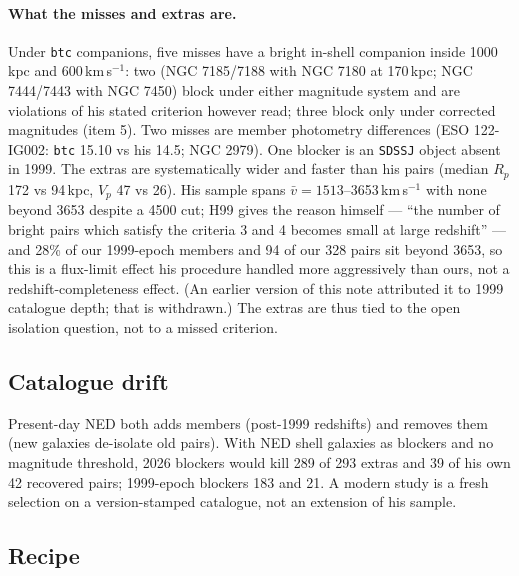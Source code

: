 \documentclass[11pt]{article}
\begin{document}
\paragraph{What the misses and extras are.} Under \texttt{btc} companions,
five misses have a bright in-shell companion inside 1000\,kpc and
600\,km\,s$^{-1}$: two (NGC 7185/7188 with NGC 7180 at 170\,kpc; NGC
7444/7443 with NGC 7450) block under either magnitude system and are
violations of his stated criterion however read; three block only under
corrected magnitudes (item 5). Two misses are member photometry differences
(ESO 122-IG002: \texttt{btc} 15.10 vs his 14.5; NGC 2979). One blocker is an
\texttt{SDSSJ} object absent in 1999. The extras are systematically wider and
faster than his pairs (median $R_p$ 172 vs 94\,kpc, $V_p$ 47 vs 26). His
sample spans $\bar v = 1513$--3653\,km\,s$^{-1}$ with none beyond 3653 despite
a 4500 cut; H99 gives the reason himself --- ``the number of bright pairs
which satisfy the criteria 3 and 4 becomes small at large redshift'' --- and
28\% of our 1999-epoch members and 94 of our 328 pairs sit beyond 3653, so
this is a flux-limit effect his procedure handled more aggressively than ours,
not a redshift-completeness effect. (An earlier version of this note
attributed it to 1999 catalogue depth; that is withdrawn.) The extras are thus
tied to the open isolation question, not to a missed criterion.

\subsection{Catalogue drift}

Present-day NED both adds members (post-1999 redshifts) and removes them (new
galaxies de-isolate old pairs). With NED shell galaxies as blockers and no
magnitude threshold, 2026 blockers would kill 289 of 293 extras and 39 of his
own 42 recovered pairs; 1999-epoch blockers 183 and 21. A modern study is a
fresh selection on a version-stamped catalogue, not an extension of his
sample.

\subsection{Recipe}
\end{document}
